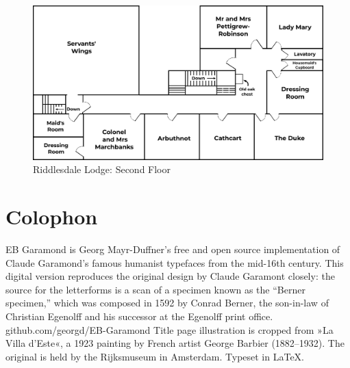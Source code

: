 \documentclass[
a5paper,
BCOR=7mm,
twoside,
DIV=calc,
12pt,
usegeometry,
chapterprefix,
headings=big]{scrbook} %
\begin{document}
\clearpage

\begin{figure}
\includegraphics[width=\columnwidth]{secondfloorlabeled}%
\caption{Riddlesdale Lodge: Second Floor}
\end{figure}




\footskip=30pt



\mainmatter
\pagestyle{headings}
\renewcommand*{\chapterpagestyle}{plain}























\clearpage
{}
\chapter*{Colophon}
\begin{center}
EB Garamond is Georg Mayr-Duffner's free and open source implementation of Claude Garamond’s famous humanist typefaces from the mid-16th century. This digital version reproduces the original design by Claude Garamont closely: the source for the letterforms is a scan of a specimen known as the \enquote{Berner specimen,} which was composed in 1592 by Conrad Berner, the son-in-law of Christian Egenolff and his successor at the Egenolff print office.  \\github.com/georgd/EB-Garamond
\vfill
Title page illustration is cropped from »La Villa d'Este«, a 1923 painting by French artist George Barbier (1882–1932). The original is held by the Rijksmuseum in Amsterdam.
\vfill
Typeset in \LaTeX{}.
\end{center}
\thispagestyle{empty}
\end{document}
